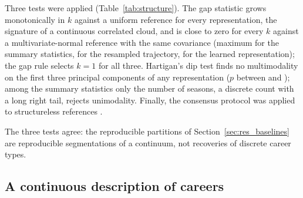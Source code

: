 Three tests were applied (Table~\ref{tab:structure}). The gap statistic \citep{tibshirani2001} grows monotonically in $k$ against a uniform reference for every representation, the signature of a continuous correlated cloud, and is close to zero for every $k$ against a multivariate-normal reference with the same covariance (maximum \gapSummNormalMax{} for the summary statistics, \gapRawNormalMax{} for the resampled trajectory, \gapAeNormalMax{} for the learned representation); the gap rule selects $k=1$ for all three. Hartigan's dip test \citep{hartigan1985} finds no multimodality on the first three principal components of any representation ($p$ between \dipPmin{} and \dipPmax); among the summary statistics only the number of seasons, a discrete count with a long right tail, rejects unimodality. Finally, the consensus protocol was applied to structureless references \citep{senbabaoglu2014}. \nullSentence

The three tests agree: the reproducible partitions of Section~\ref{sec:res_baselines} are reproducible segmentations of a continuum, not recoveries of discrete career types.

\begin{table}[t]\centering\small
\caption{Tests for discrete structure. Gap statistic: maximum over $k=2,\dots,12$ against a multivariate-normal reference with the sample covariance and the $k$ selected by the gap rule. Dip test: $p$-values of Hartigan's test on the first three principal components. Null consensus: mean consensus Silhouette over three simulated datasets at $k=4$ and $k=8$ for a multivariate-normal reference and for a Gaussian copula with the real marginals. $^a$Gap and dip statistics for the autoencoder are computed on the seed-0 latent space; consensus values are for the five-seed ensemble.}
\label{tab:structure}
\resizebox{\textwidth}{!}{}
\end{table}

\subsection{A continuous description of careers}\label{sec:res_continuous}


